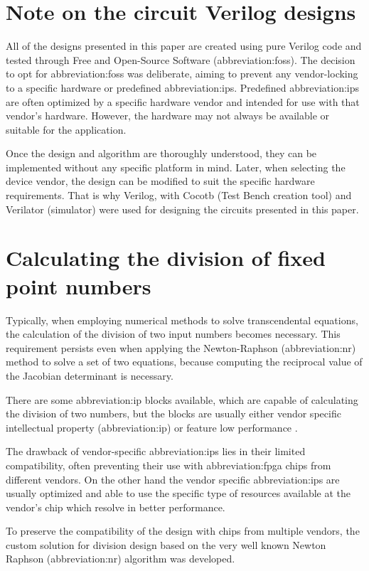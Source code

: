 \documentclass[a4paper, twoside, 11pt]{article}
\begin{document}
\flushbottom %
\newpage

\section{Note on the circuit Verilog designs}
    All of the designs presented in this paper are created using pure Verilog code and tested through Free and Open-Source Software (\gls{abbreviation:foss}). The decision to opt for \gls{abbreviation:foss}  was deliberate, aiming to prevent any vendor-locking to a specific hardware or predefined \gls{abbreviation:ip}s. Predefined \gls{abbreviation:ip}s  are often optimized by a specific hardware vendor and intended for use with that vendor's hardware. However, the hardware may not always be available or suitable for the application.\par
    Once the design and algorithm are thoroughly understood, they can be implemented without any specific platform in mind. Later, when selecting the device vendor, the design can be modified to suit the specific hardware requirements. That is why Verilog, with Cocotb \cite{cocotb} (Test Bench creation tool) and Verilator \cite{verilator} (simulator) were used for designing the circuits presented in this paper.\par

\section{Calculating the division of fixed point numbers}\label{sec:calculating-the-division-of-fixed-point-numbers}
Typically, when employing numerical methods to solve transcendental equations, the calculation of the division of two input numbers becomes necessary. This requirement persists even when applying the Newton-Raphson (\gls{abbreviation:nr}) method to solve a set of two equations, because computing the reciprocal value of the Jacobian determinant is necessary.\par
There are some \gls{abbreviation:ip} blocks available, which are capable of calculating the division of two numbers, but the blocks are usually either vendor specific intellectual property (\gls{abbreviation:ip}) \cite{amd-xilinx-vivado-divider-ip-block} or feature low performance \cite{burke-fixed-point-math-library}.\par
The drawback of vendor-specific \gls{abbreviation:ip}s lies in their limited compatibility, often preventing their use with \gls{abbreviation:fpga} chips from different vendors. On the other hand the vendor specific \gls{abbreviation:ip}s are usually optimized and able to use the specific type of resources available at the vendor's chip which resolve in better performance.\par
To preserve the compatibility of the design with chips from multiple vendors, the custom solution for division design based on the very well known Newton Raphson (\gls{abbreviation:nr}) algorithm was developed. \cite{burke-fixed-point-math-library}
\end{document}

